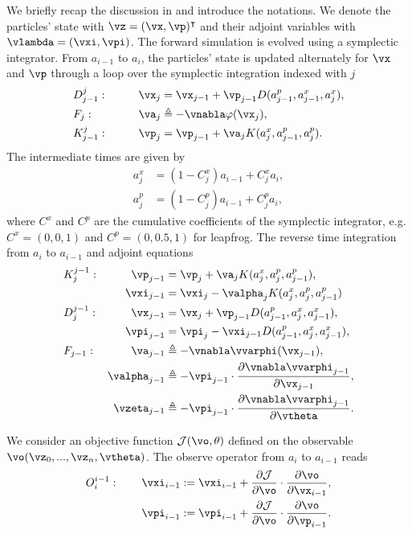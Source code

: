 \documentclass[usenatbib]{mnras}
\newcommand{\p}{\partial}
\newcommand{\cJ}{\mathcal{J}}
\begin{document}
We briefly recap the discussion in \citet{Li2022a} and introduce the notations.
We denote the particles' state with $\vz = (\vx, \vp)^\intercal$ and their
adjoint variables with $\vlambda = (\vxi, \vpi)$.
The forward simulation is evolved using a symplectic integrator.
From $a_{i-1}$ to $a_i$, the particles' state is updated alternately for $\vx$
and $\vp$ through a loop over the symplectic integration indexed with $j$
\begin{alignat}{2}
&D_{j-1}^j: &\qquad \vx_j &= \vx_{j-1} +
  \vp_{j-1} D(a^p_{j-1}, a^x_{j-1}, a^x_j), \nonumber\\
%
&F_j: & \va_j &\triangleq -\vnabla\varphi(\vx_j), \nonumber\\
%
&K_{j-1}^j: & \vp_j &= \vp_{j-1} + \va_j K(a^x_j, a^p_{j-1}, a^p_j).
\label{DFK}
\end{alignat}
The intermediate times are given by
\begin{align}
a^x_j &= (1 - C^x_j) a_{i-1} + C^x_j a_i, \nonumber\\
a^p_j &= (1 - C^p_j) a_{i-1} + C^p_j a_i,
\end{align}
where $C^x$ and $C^p$ are the cumulative coefficients of the symplectic
integrator, e.g. $C^x = (0, 0, 1)$ and $C^p = (0, 0.5, 1)$ for leapfrog.
The reverse time integration from $a_i$ to $a_{i-1}$ and adjoint equations
\begin{alignat}{2}
&K_j^{j-1}: &\qquad \vp_{j-1} &= \vp_j +
  \va_j K(a^x_j, a^p_j, a^p_{j-1}), \nonumber\\
%
& & \vxi_{j-1} &= \vxi_j - \valpha_j K(a^x_j, a^p_j, a^p_{j-1}) \nonumber\\
%
&D_j^{j-1}: & \vx_{j-1} &= \vx_j +
  \vp_{j-1} D(a^p_{j-1}, a^x_j, a^x_{j-1}), \nonumber\\
%
& & \vpi_{j-1} &= \vpi_j - \vxi_{j-1} D(a^p_{j-1}, a^x_j, a^x_{j-1}), \nonumber\\
%
&F_{j-1}: & \va_{j-1} &\triangleq -\vnabla\vvarphi(\vx_{j-1}), \nonumber\\
%
& & \valpha_{j-1} &\triangleq -\vpi_{j-1} \cdot
  \frac{\p\vnabla\vvarphi_{j-1}}{\p\vx_{j-1}}, \nonumber\\
& & \vzeta_{j-1} &\triangleq - \vpi_{j-1} \cdot
  \frac{\p\vnabla\vvarphi_{j-1}}{\p\vtheta}.
\label{KDF_adj}
\end{alignat}

We consider an objective function $\cJ(\vo, \theta)$ defined on the observable
$\vo(\vz_0,...,\vz_n,\vtheta)$.
The observe operator from $a_i$ to $a_{i-1}$ reads
\begin{align}
  O_i^{i-1}: \qquad \vxi_{i-1} :\:\!\!\!&= \vxi_{i-1}
  + \frac{\p\cJ}{\p\vo} \cdot \frac{\p\vo}{\p\vx_{i-1}}, \nonumber\\
                    \vpi_{i-1} :\:\!\!\!&= \vpi_{i-1}
  + \frac{\p\cJ}{\p\vo} \cdot \frac{\p\vo}{\p\vp_{i-1}}.
\end{align}
\end{document}

